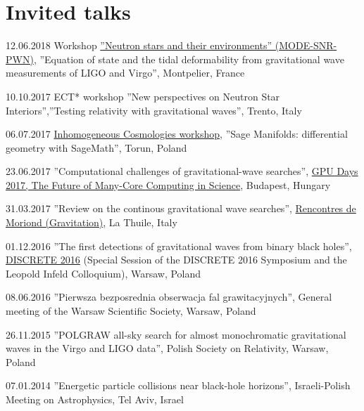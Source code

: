 \documentclass[]{friggeri-cv} %
\begin{document}
\section{Invited talks}
\begin{entrylistoc}

\entrys
{12.06.2018}
{{Workshop \href{https://mode2018.sciencesconf.org/program}{''Neutron stars and their environments'' (MODE-SNR-PWN)}}, {''Equation of state and the tidal deformability from gravitational wave measurements of LIGO and Virgo'', Montpelier, France}}

\entrys 
{10.10.2017} 
{{ECT* workshop ''New perspectives on Neutron Star Interiors''},{''Testing relativity with gravitational waves'', Trento, Italy}} 

\entrys
{06.07.2017} 
{\href{https://cosmo.torun.pl/cosmotorun17.html}{Inhomogeneous Cosmologies workshop}, ''Sage Manifolds: differential geometry with SageMath'', Torun, Poland} 

\entrys 
{23.06.2017}
{''Computational challenges of gravitational-wave searches'', \href{http://gpuday.com}{GPU Days 2017, The Future of Many-Core Computing in Science}, Budapest, Hungary} 

\entrys 
{31.03.2017}
{''Review on the continous gravitational wave searches'', \href{http://moriond.in2p3.fr/grav/2017/program.php\#Friday}{Rencontres de Moriond (Gravitation)}, La Thuile, Italy}

\entrys 
{01.12.2016}
{''The first detections of gravitational waves from binary black holes'', \href{http://indico.fuw.edu.pl/sessionDisplay.py?contribId=57\&sessionId=44\&confId=46\#20161201}{DISCRETE 2016} (Special Session of the DISCRETE 2016 Symposium and the Leopold Infeld Colloquium), Warsaw, Poland}

\entrys 
{08.06.2016} 
{''Pierwsza bezposrednia obserwacja fal grawitacyjnych'', General meeting of the Warsaw Scientific Society, Warsaw, Poland} 

\entrys
{26.11.2015}
{''POLGRAW all-sky search for almost monochromatic gravitational waves in the Virgo and LIGO data'', Polish Society on Relativity, Warsaw, Poland}


\entrys
{07.01.2014}
{''Energetic particle collisions near black-hole horizons'', Israeli-Polish Meeting on Astrophysics, Tel Aviv, Israel}


\end{entrylistoc}
\end{document}
